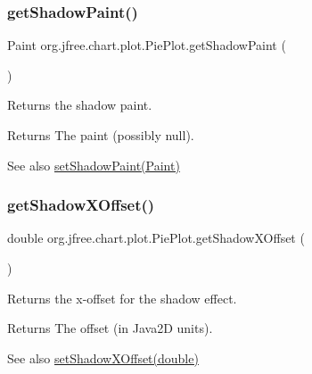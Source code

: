\subsubsection{\texorpdfstring{get\+Shadow\+Paint()}{getShadowPaint()}}
{\footnotesize\ttfamily Paint org.\+jfree.\+chart.\+plot.\+Pie\+Plot.\+get\+Shadow\+Paint (\begin{DoxyParamCaption}{ }\end{DoxyParamCaption})}

Returns the shadow paint.

\begin{DoxyReturn}{Returns}
The paint (possibly {\ttfamily null}).
\end{DoxyReturn}
\begin{DoxySeeAlso}{See also}
\mbox{\hyperlink{classorg_1_1jfree_1_1chart_1_1plot_1_1_pie_plot_a2a77730b54c9d7f6a3395dab0eeadcb9}{set\+Shadow\+Paint(\+Paint)}} 
\end{DoxySeeAlso}
\mbox{\label{classorg_1_1jfree_1_1chart_1_1plot_1_1_pie_plot_a1c2adbcc6f258fa7ff132d8dfe82216c}} 
\subsubsection{\texorpdfstring{get\+Shadow\+X\+Offset()}{getShadowXOffset()}}
{\footnotesize\ttfamily double org.\+jfree.\+chart.\+plot.\+Pie\+Plot.\+get\+Shadow\+X\+Offset (\begin{DoxyParamCaption}{ }\end{DoxyParamCaption})}

Returns the x-\/offset for the shadow effect.

\begin{DoxyReturn}{Returns}
The offset (in Java2D units).
\end{DoxyReturn}
\begin{DoxySeeAlso}{See also}
\mbox{\hyperlink{classorg_1_1jfree_1_1chart_1_1plot_1_1_pie_plot_a98d8b7faad998b6a5cbc262e4fcb9427}{set\+Shadow\+X\+Offset(double)}} 
\end{DoxySeeAlso}
\mbox{\label{classorg_1_1jfree_1_1chart_1_1plot_1_1_pie_plot_aa8ce8f748fd74382996feb0b02fa7bce}} 
